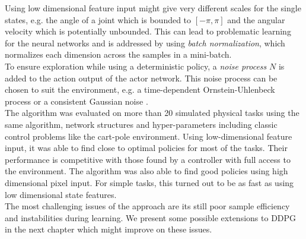 Using low dimensional feature input might give very different scales for the single states, e.g. the angle of a joint which is bounded to $[-\pi, \pi]$ and the angular velocity which is potentially unbounded. This can lead to problematic learning for the neural networks and is addressed by using \textit{batch normalization}, which normalizes each dimension across the samples in a mini-batch.\\
To ensure exploration while using a deterministic policy, a \textit{noise process} $\mathit{N}$ is added to the action output of the actor network. This noise process can be chosen to suit the environment, e.g. a time-dependent Ornstein-Uhlenbeck process \citep{ricciardi1979ornstein} or a consistent Gaussian noise \citep{barth2018distributed}.\\
The algorithm was evaluated on more than 20 simulated physical tasks using the same algorithm, network structures and hyper-parameters including classic control problems like the cart-pole environment. Using low-dimensional feature input, it was able to find close to optimal policies for most of the tasks. Their performance is competitive with those found by a controller with full access to the environment. The algorithm was also able to find good policies using high dimensional pixel input. For simple tasks, this turned out to be as fast as using low dimensional state features.\\
The most challenging issues of the approach are its still poor sample efficiency and instabilities during learning. We present some possible extensions to DDPG in the next chapter which might improve on these issues.
